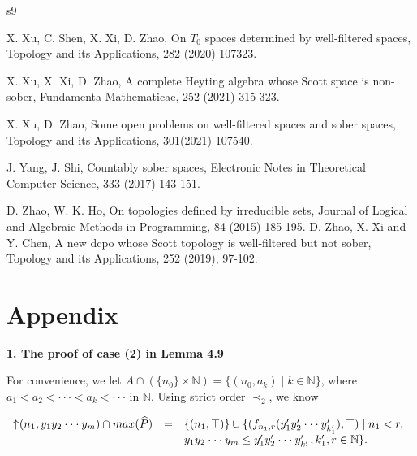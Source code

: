 \documentclass[preprint,12pt]{elsarticle}
\numberwithin{equation}{section}
\newcommand{\up}{\mathord{\uparrow}\hspace{0.05em}}
\begin{document}
\begin{thebibliography}{s9}
{ X. Xu, C. Shen, X. Xi, D. Zhao, On $T_{0}$ spaces determined by well-filtered spaces, Topology and its Applications, 282 (2020) 107323.

 X. Xu, X. Xi, D. Zhao, A complete Heyting algebra whose Scott space is non-sober, Fundamenta Mathematicae, 252 (2021) 315-323.

X. Xu, D. Zhao, Some open problems on well-filtered spaces and sober spaces, Topology and its Applications, 301(2021) 107540.

 J. Yang, J. Shi, Countably sober spaces, Electronic Notes in Theoretical Computer Science,  333 (2017) 143-151.

 D. Zhao, W. K. Ho, On topologies defined by irreducible sets, Journal of Logical and Algebraic Methods in Programming, 84 (2015) 185-195.
 D. Zhao, X. Xi and Y. Chen, A new dcpo whose Scott topology is well-filtered but not sober,  Topology and its Applications, 252 (2019),
97-102.

}








\end{thebibliography}























\newpage

\section{Appendix}

{\bf 1. The proof of case (2) in Lemma 4.9}

For convenience, we let $A\cap (\{n_{0}\}\times \mathbb{N})=\{(n_{0},a_{k})\mid k\in\mathbb{N}\}$, where $a_{1}< a_{2}<\cdot\cdot\cdot <a_{k}<\cdot\cdot\cdot$ in $\mathbb{N}$.
Using strict order $\prec_{2}$, we know
\setlength{\baselineskip}{0.7\baselineskip}

 \begin{center}$\begin{array}{lll}
\up(n_{1},y_{1}y_{2}\cdot\cdot\cdot y_{m})\cap max(\widehat{P})&=&\{(n_{1},\top)\}\cup\{(f_{n_{1},r}(y'_{1}y'_{2}\cdot\cdot\cdot y'_{k'_{1}}),\top)\mid n_{1}<r,\\
&& y_{1}y_{2}\cdot\cdot\cdot y_{m}\leq y'_{1}y'_{2}\cdot\cdot\cdot y'_{k'_{1}},k'_{1},r\in\mathbb{N}\}.\\
\end{array}$\end{center}
\end{document}
